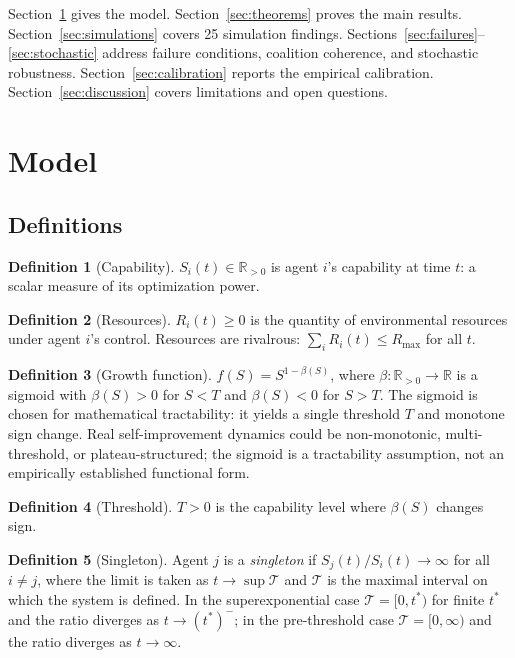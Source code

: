 \documentclass[11pt,letterpaper]{article}
\theoremstyle{plain}
\theoremstyle{definition}
\newtheorem{definition}{Definition}[section]
\theoremstyle{remark}
\newcommand{\Rmax}{R_{\max}}
\newcommand{\tstar}{t^{*}}
\begin{document}
Section~\ref{sec:model} gives the model.
Section~\ref{sec:theorems} proves the main results.
Section~\ref{sec:simulations} covers 25 simulation findings.
Sections~\ref{sec:failures}--\ref{sec:stochastic} address failure conditions,
coalition coherence, and stochastic robustness.
Section~\ref{sec:calibration} reports the empirical calibration.
Section~\ref{sec:discussion} covers limitations and open questions.

\section{Model}
\label{sec:model}

\subsection{Definitions}

\begin{definition}[Capability]
$S_i(t) \in \mathbb{R}_{>0}$ is agent $i$'s capability at time $t$: a scalar
measure of its optimization power.
\end{definition}

\begin{definition}[Resources]
$R_i(t) \geq 0$ is the quantity of environmental resources under agent $i$'s
control. Resources are rivalrous: $\sum_i R_i(t) \leq \Rmax$ for all $t$.
\end{definition}

\begin{definition}[Growth function]
$f(S) = S^{1-\beta(S)}$, where $\beta: \mathbb{R}_{>0} \to \mathbb{R}$ is a
sigmoid with $\beta(S) > 0$ for $S < T$ and $\beta(S) < 0$ for $S > T$.
The sigmoid is chosen for mathematical tractability: it yields a single
threshold $T$ and monotone sign change.
Real self-improvement dynamics could be non-monotonic, multi-threshold, or
plateau-structured; the sigmoid is a tractability assumption, not an
empirically established functional form.
\end{definition}

\begin{definition}[Threshold]
$T > 0$ is the capability level where $\beta(S)$ changes sign.
\end{definition}

\begin{definition}[Singleton]
Agent $j$ is a \emph{singleton} if $S_j(t)/S_i(t) \to \infty$ for all
$i \neq j$, where the limit is taken as $t \to \sup\mathcal{T}$ and
$\mathcal{T}$ is the maximal interval on which the system is defined.
In the superexponential case $\mathcal{T} = [0,\tstar)$ for finite $\tstar$
and the ratio diverges as $t \to (t^*)^-$; in the pre-threshold case
$\mathcal{T} = [0,\infty)$ and the ratio diverges as $t \to \infty$.
\end{definition}
\end{document}
